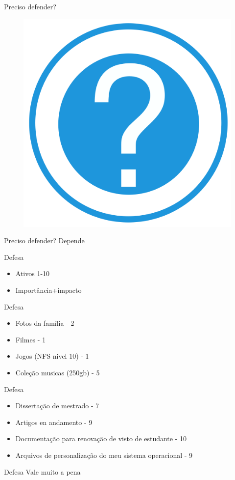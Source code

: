\documentclass{beamer}
\begin{document}
\begin{frame}{Preciso defender?}
\begin{figure}[tbph]
\centering
\includegraphics[width=0.3\linewidth]{./question}
\label{fig:question}
\end{figure}
\end{frame}

\begin{frame}{Preciso defender?}
Depende
\end{frame}

\begin{frame}{Defesa}
\begin{itemize}
\item Ativos 1-10
\item Importância+impacto
\end{itemize}
\end{frame}

\begin{frame}{Defesa}
\begin{itemize}
\item Fotos da família - 2
\item Filmes - 1
\item Jogos (NFS nivel 10) - 1
\item Coleção musicas (250gb) - 5
\end{itemize}
\end{frame}

\begin{frame}{Defesa}
\begin{itemize}
\item Dissertação de mestrado - 7
\item Artigos en andamento - 9
\item Documentação para renovação de visto de estudante - 10
\item Arquivos de personalização do meu sistema operacional - 9
\end{itemize}
\end{frame}

\begin{frame}{Defesa}
Vale muito a pena
\end{frame}
\end{document}
